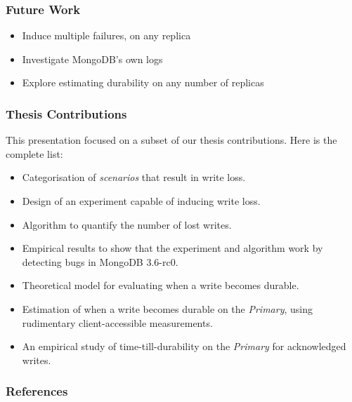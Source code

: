 \documentclass[numfooter,sectionpages,protectFrameTitle, progressbar, cblock, valigncolumns, addlogo]{beamer}
\begin{document}
\begin{frame}
    \frametitle{Future Work}

    \begin{itemize}
        \item Induce multiple failures, on any replica
        \item Investigate MongoDB's own logs
        \item Explore estimating durability on any number of replicas
    \end{itemize}
\end{frame}

\begin{frame}
    \frametitle{Thesis Contributions}

    This presentation focused on a subset of our thesis contributions. Here is the complete list:

    \begin{itemize}
        \item Categorisation of \textit{scenarios} that result in write loss.
        \item Design of an experiment capable of inducing write loss.
        \item Algorithm to quantify the number of lost writes.
        \item Empirical results to show that the experiment and algorithm work by detecting bugs in MongoDB 3.6-rc0.
        \item Theoretical model for evaluating when a write becomes durable.
        \item Estimation of when a write becomes durable on the \textit{Primary}, using rudimentary client-accessible measurements.
        \item An empirical study of time-till-durability on the \textit{Primary} for acknowledged writes.
    \end{itemize}


\end{frame}

\begin{frame}[allowframebreaks]
    \frametitle{References}
    
\end{frame}
\end{document}
